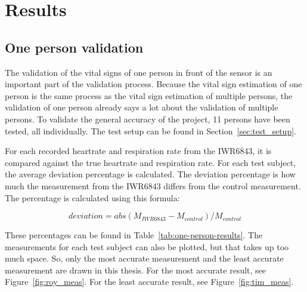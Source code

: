 \section{Results}
\subsection{One person validation}
\label{sec:one_pers_validation}
The validation of the vital signs of one person in front of the sensor is an important part of the validation process. Because the vital sign estimation of one person is the same process as the vital sign estimation of multiple persons, the validation of one person already says a lot about the validation of multiple persons. To validate the general accuracy of the project, 11 persons have been tested, all individually. The test setup can be found in Section~\ref{sec:test_setup}. 

For each recorded heartrate and respiration rate from the IWR6843, it is compared against the true heartrate and respiration rate. For each test subject, the average deviation percentage is calculated. The deviation percentage is how much the measurement from the IWR6843 differs from the control measurement. The percentage is calculated using this formula:

\begin{equation}
    deviation = abs(M_{IWR6843} - M_{control}) / M_{control}
    \label{eq:deviation_calculation}
\end{equation}

These percentages can be found in Table~\ref{tab:one-person-results}. The measurements for each test subject can also be plotted, but that takes up too much space. So, only the most accurate measurement and the least accurate measurement are drawn in this thesis. For the most accurate result, see Figure~\ref{fig:roy_meas}. For the least accurate result, see Figure~\ref{fig:tim_meas}.

